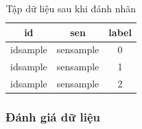 
\begin{table}[H]
\centering
\begin{minipage}{1.0\textwidth}
\caption{Tập dữ liệu sau khi đánh nhãn} 
\label{table:labeleddata}
\begin{tabular}{ |c|c|c| } 
 \hline
 id & sen & label \\ 
 \hline
 idsample & sensample & 0 \\ 
 idsample & sensample & 1 \\ 
 idsample & sensample & 2 \\ 
 \hline
\end{tabular}
\end{minipage}
\end{table}

\subsubsection*{Đánh giá dữ liệu}

